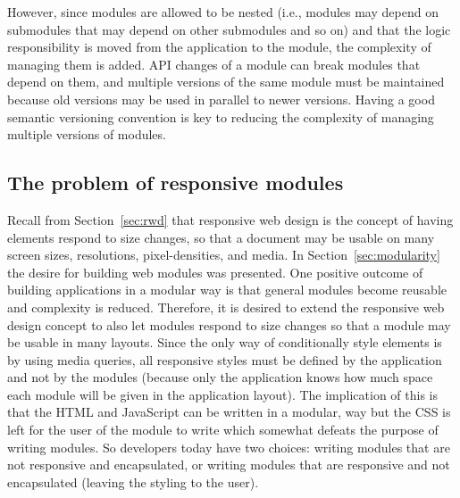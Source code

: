 \documentclass[a4paper,11pt]{kth-mag}
\begin{document}
        However, since modules are allowed to be nested (i.e., modules may depend on submodules that may depend on other submodules and so on) and that the logic responsibility is moved from the application to the module, the complexity of managing them is added.
        \gls{API} changes of a module can break modules that depend on them, and multiple versions of the same module must be maintained because old versions may be used in parallel to newer versions.
        Having a good semantic versioning convention is key to reducing the complexity of managing multiple versions of modules.

      \subsection{The problem of responsive modules}\label{sec:rwd-modular-problem}
        Recall from Section~\ref{sec:rwd} that \gls{responsive} \gls{web} design is the concept of having \glspl{element} respond to size changes, so that a \gls{document} may be usable on many screen sizes, resolutions, pixel-densities, and media.
        In Section~\ref{sec:modularity} the desire for building \gls{web} modules was presented.
        One positive outcome of building applications in a modular way is that general modules become reusable and complexity is reduced.
        Therefore, it is desired to extend the \gls{responsive} \gls{web} design concept to also let modules respond to size changes so that a module may be usable in many layouts.
        Since the only way of conditionally style \glspl{element} is by using \gls{media queries}, all \gls{responsive} styles must be defined by the application and not by the modules (because only the application knows how much space each module will be given in the application layout).
        The implication of this is that the \gls{HTML} and \gls{JavaScript} can be written in a modular, way but the \gls{CSS} is left for the user of the module to write which somewhat defeats the purpose of writing modules.
        So developers today have two choices: writing modules that are not \gls{responsive} and \gls{encapsulated}, or writing modules that are \gls{responsive} and not \gls{encapsulated} (leaving the styling to the user).        
\end{document}
